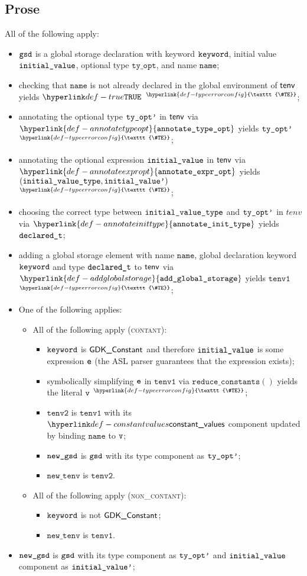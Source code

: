 \documentclass{book}
\newcommand\TypeErrorConfig[0]{\hyperlink{def-typeerrorconfig}{\texttt{\#TE}}}
\newcommand\ProseOrTypeError[0]{\hyperlink{def-proseortypeerror}{$^{\TypeErrorConfig}$}}
\newcommand\annotatetypeopt[0]{\hyperlink{def-annotatetypeopt}{\texttt{annotate\_type\_opt}}}
\newcommand\annotateexpropt[0]{\hyperlink{def-annotateexpropt}{\texttt{annotate\_expr\_opt}}}
\newcommand\annotateinittype[0]{\hyperlink{def-annotateinittype}{\texttt{annotate\_init\_type}}}
\newcommand\addglobalstorage[0]{\hyperlink{def-addglobalstorage}{\texttt{add\_global\_storage}}}
\newcommand\reduceconstants[1]{\texttt{reduce\_constants}(#1)}
\newcommand\newtenv[0]{\texttt{new\_tenv}}
\newcommand\tenvone[0]{\texttt{tenv1}}
\newcommand\tenvtwo[0]{\texttt{tenv2}}
\newcommand\tyopt[0]{\texttt{ty\_opt}}
\newcommand\name[0]{\texttt{name}}
\begin{document}
\subsection{Prose}
All of the following apply:
\begin{itemize}
  \item $\texttt{gsd}$ is a global storage declaration with keyword $\texttt{keyword}$, initial value \\ $\texttt{initial\_value}$,
        optional type $\tyopt$, and name $\name$;
  \item checking that $\name$ is not already declared in the global environment of $\textsf{tenv}$ yields $\True$ \ProseOrTypeError;
  \item annotating the optional type $\texttt{ty\_opt'}$ in $\textsf{tenv}$ via $\annotatetypeopt$ yields $\texttt{ty\_opt'}$ \ProseOrTypeError;
  \item annotating the optional expression $\texttt{initial\_value}$ in $\textsf{tenv}$ via $\annotateexpropt$ yields
        $(\texttt{initial\_value\_type}, \texttt{initial\_value'})$ \ProseOrTypeError;
  \item choosing the correct type between $\texttt{initial\_value\_type}$ and $\texttt{ty\_opt'}$ in $tenv$ via $\annotateinittype$ yields
        $\texttt{declared\_t}$;
  \item adding a global storage element with name $\name$, global declaration keyword \\ $\texttt{keyword}$ and type $\texttt{declared\_t}$
        to $\textsf{tenv}$ via $\addglobalstorage$ yields $\tenvone$ \ProseOrTypeError;
  \item One of the following applies:
  \begin{itemize}
    \item All of the following apply (\textsc{contant}):
    \begin{itemize}
      \item $\texttt{keyword}$ is $\textsf{GDK\_Constant}$ and therefore $\texttt{initial\_value}$ is some expression $\texttt{e}$ (the ASL parser guarantees
            that the expression exists);
      \item symbolically simplifying $\texttt{e}$ in $\tenvone$ via $\reduceconstants{}$ yields the literal $\texttt{v}$ \ProseOrTypeError;
      \item $\tenvtwo$ is $\tenvone$ with its $\constantvalues$ component updated by binding $\name$ to $\texttt{v}$;
      \item $\texttt{new\_gsd}$ is $\texttt{gsd}$ with its type component as $\texttt{ty\_opt'}$;
      \item $\newtenv$ is $\tenvtwo$.
    \end{itemize}

    \item All of the following apply (\textsc{non\_contant}):
    \begin{itemize}
      \item $\texttt{keyword}$ is not $\textsf{GDK\_Constant}$;
      \item $\newtenv$ is $\tenvone$.
    \end{itemize}
  \end{itemize}
  \item $\texttt{new\_gsd}$ is $\texttt{gsd}$ with its type component as $\texttt{ty\_opt'}$ and $\texttt{initial\_value}$ component as $\texttt{initial\_value'}$;
\end{itemize}
\end{document}
